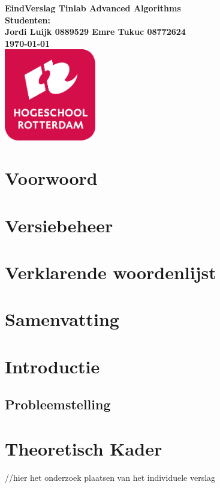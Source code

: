 \documentclass{article}
\begin{document}
\sffamily



\begin{titlepage}
  \centering
    \vfill
    {\bfseries\Huge
      EindVerslag Tinlab Advanced Algorithms \\
        \vskip2cm
      }
      {\bfseries\Large
        Studenten:\\
      }
      {
        \bfseries\normalsize
        Jordi Luijk 0889529 \newline
        Emre Tukuc 08772624 \newline\\
        \vskip1cm
        \today\\
    }    
    \vfill
    \includegraphics[width=4cm]{logohr.png} %
    \vfill
    \vfill
\end{titlepage}
\newpage
\tableofcontents

\newpage
\section{Voorwoord}
\section{Versiebeheer}
\section{Verklarende woordenlijst}
\section{Samenvatting}
\section{Introductie}
\subsection{Probleemstelling}
\section{Theoretisch Kader}
//hier het onderzoek plaatsen van het individuele verslag
\end{document}

